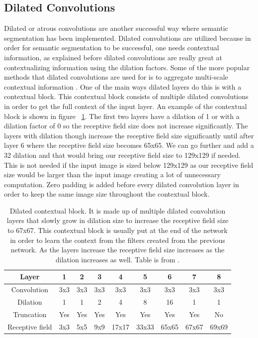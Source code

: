\subsection{Dilated Convolutions}
Dilated or atrous convolutions are another successful way where semantic segmentation has been implemented. 
Dilated convolutions are utilized because in order for semantic segmentation to be successful, one needs contextual information, as explained before dilated convolutions are really great at contextualizing information using the dilation factors. 
Some of the more popular methods that dilated convolutions are used for is to aggregate multi-scale contextual information  \cite{Yu2016MultiScaleCA}. 
One of the main ways dilated layers do this is with a contextual block. 
This contextual block consists of multiple dilated convolutions in order to get the full context of the input layer. 
An example of the contextual block is shown in figure ~\ref{tab.dilated_context}. 
The first two layers have a dilation of 1 or with a dilation factor of 0 so the receptive field size does not increase significantly. 
The layers with dilation though increase the receptive field size significantly until after layer 6 where the receptive field size becomes 65x65. 
We can go further and add a 32 dilation and that would bring our receptive field size to 129x129 if needed. 
This is not needed if the input image is sized below 129x129 as our receptive field size would be larger than the input image creating a lot of unnecessary computation. 
Zero padding is added before every dilated convolution layer in order to keep the same image size throughout the contextual block.

\begin{table}[tbh]
\renewcommand{\arraystretch}{0.7}
\centering
\begin{tabular}{|c |c|c|c|c|c|c|c|c|}
\hline
\textbf{Layer} & 1 & 2 & 3 & 4 & 5 & 6 & 7 & 8\\
\hline
\hline
Convolution & 3x3 & 3x3 & 3x3 & 3x3 & 3x3 & 3x3 & 3x3 & 3x3\\      
\hline
Dilation & 1 & 1 & 2 & 4 & 8 & 16 & 1 & 1\\
\hline
Truncation & Yes & Yes & Yes & Yes & Yes & Yes & Yes & No\\
\hline
Receptive field & 3x3 & 5x5 & 9x9 & 17x17 & 33x33 & 65x65 & 67x67 & 69x69\\
\hline
\end{tabular}
\caption{Dilated contextual block. It is made up of multiple dilated convolution layers that slowly grow in dilation size to increase the receptive field size to 67x67. This contextual block is usually put at the end of the network in order to learn the context from the filters created from the previous network. As the layers increase the receptive field size increases as the dilation increases as well. Table is from \cite{Yu2016MultiScaleCA}.}
\label{tab.dilated_context}
\end{table}

